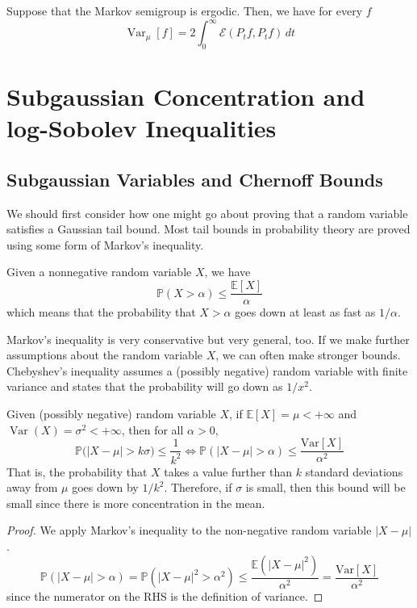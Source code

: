 \documentclass{article}
\DeclareMathOperator{\Var}{Var}
\begin{document}
\begin{theorem}
Suppose that the Markov semigroup is ergodic. Then, we have for every $f$ 
\[\Var_\mu [f] = 2 \int_0^\infty \mathcal{E}(P_t f, P_t f) \, dt\]
\end{theorem}

\section{Subgaussian Concentration and log-Sobolev Inequalities}

\subsection{Subgaussian Variables and Chernoff Bounds}

We should first consider how one might go about proving that a random variable satisfies a Gaussian tail bound. Most tail bounds in probability theory are proved using some form of Markov's inequality. 
\begin{lemma}
Given a nonnegative random variable $X$, we have 
\[\mathbb{P}(X > \alpha) \leq \frac{\mathbb{E}[X]}{\alpha}\]
which means that the probability that $X > \alpha$ goes down at least as fast as $1/\alpha$. 
\end{lemma}

Markov's inequality is very conservative but very general, too. If we make further assumptions about the random variable $X$, we can often make stronger bounds. Chebyshev's inequality assumes a (possibly negative) random variable with finite variance and states that the probability will go down as $1/x^2$. 

\begin{theorem}
Given (possibly negative) random variable $X$, if $\mathbb{E}[X] = \mu < +\infty$ and $\Var(X) = \sigma^2 < +\infty$, then for all $\alpha > 0$, 
\[\mathbb{P} \big( |X - \mu| > k \sigma \big) \leq \frac{1}{k^2} \iff \mathbb{P}(|X - \mu| > \alpha) \leq \frac{\mathrm{Var}[X]}{\alpha^2}\]
That is, the probability that $X$ takes a value further than $k$ standard deviations away from $\mu$ goes down by $1/k^2$. Therefore, if $\sigma$ is small, then this bound will be small since there is more concentration in the mean. 
\end{theorem}
\begin{proof}
We apply Markov's inequality to the non-negative random variable $|X - \mu|$. 
\[\mathbb{P}(|X - \mu| > \alpha) = \mathbb{P}(|X - \mu|^2 > \alpha^2) \leq \frac{\mathbb{E}(|X - \mu|^2)}{\alpha^2} = \frac{\mathrm{Var}[X]}{\alpha^2}\]
since the numerator on the RHS is the definition of variance. 
\end{proof}
\end{document}
